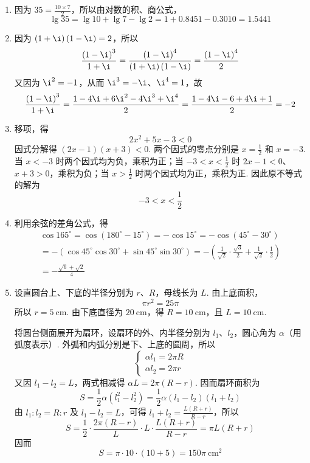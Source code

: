 \documentclass[UTF8,a4paper,oneside,11pt]{ctexbook}
\begin{document}
\begin{solution}
\begin{enumerate}
\item 因为 \(35=\frac{10\times 7}{2}\)，所以由对数的积、商公式，
\[
\lg 35=\lg 10+\lg 7-\lg 2=1+0.8451-0.3010=1.5441
\]

\item 因为 \(\left(1+\i\right)\left(1-\i\right)=2\)，所以
\[
\frac{\left(1-\i\right)^3}{1+\i}=\frac{\left(1-\i\right)^4}{\left(1+\i\right)\left(1-\i\right)}=\frac{\left(1-\i\right)^4}{2}
\]
又因为 \(\i^2=-1\)，从而 \(\i^3=-\i\)、\(\i^4=1\)，故
\[
\frac{\left(1-\i\right)^3}{1+\i}=\frac{1-4\i+6\i^2-4\i^3+\i^4}{2}=\frac{1-4\i-6+4\i+1}{2}=-2
\]

\item 移项，得
\[
2x^2+5x-3<0
\]
因式分解得 \(\left(2x-1\right)\left(x+3\right)<0\). 两个因式的零点分别是 \(x=\frac12\) 和 \(x=-3\). 当 \(x<-3\) 时两个因式均为负，乘积为正；当 \(-3<x<\frac12\) 时 \(2x-1<0\)、\(x+3>0\)，乘积为负；当 \(x>\frac12\) 时两个因式均为正，乘积为正. 因此原不等式的解为
\[
-3<x<\frac12
\]

\item 利用余弦的差角公式，得
\[
\begin{gathered}
\cos 165^\circ=\cos\left(180^\circ-15^\circ\right)=-\cos15^\circ=-\cos\left(45^\circ-30^\circ\right)\\
=-\left(\cos45^\circ\cos30^\circ+\sin45^\circ\sin30^\circ\right)=-\left(\frac{1}{\sqrt2}\cdot\frac{\sqrt3}{2}+\frac{1}{\sqrt2}\cdot\frac12\right)\\
=-\frac{\sqrt6+\sqrt2}{4}
\end{gathered}
\]

\item 设直圆台上、下底的半径分别为 \(r\)、\(R\)，母线长为 \(L\). 由上底面积，
\[
\pi r^2=25\pi
\]
所以 \(r=5\mathrm{~cm}\). 由下底直径为 \(20\mathrm{~cm}\)，得 \(R=10\mathrm{~cm}\)，且 \(L=10\mathrm{~cm}\).

将圆台侧面展开为扇环，设扇环的外、内半径分别为 \(l_1\)、\(l_2\)，圆心角为 \(\alpha\)（用弧度表示）. 外弧和内弧分别是下、上底的圆周，所以
\[
\begin{cases}
\alpha l_1=2\pi R\\
\alpha l_2=2\pi r
\end{cases}
\]
又因 \(l_1-l_2=L\)，两式相减得 \(\alpha L=2\pi\left(R-r\right)\). 因而扇环面积为
\[
S=\frac12\alpha\left(l_1^2-l_2^2\right)=\frac12\alpha\left(l_1-l_2\right)\left(l_1+l_2\right)
\]
由 \(l_1:l_2=R:r\) 及 \(l_1-l_2=L\)，可得 \(l_1+l_2=\frac{L\left(R+r\right)}{R-r}\)，所以
\[
S=\frac12\cdot\frac{2\pi\left(R-r\right)}{L}\cdot L\cdot\frac{L\left(R+r\right)}{R-r}=\pi L\left(R+r\right)
\]
因而
\[
S=\pi\cdot10\cdot\left(10+5\right)=150\pi\mathrm{~cm}^2
\]


\end{enumerate}
\end{solution}
\end{document}
